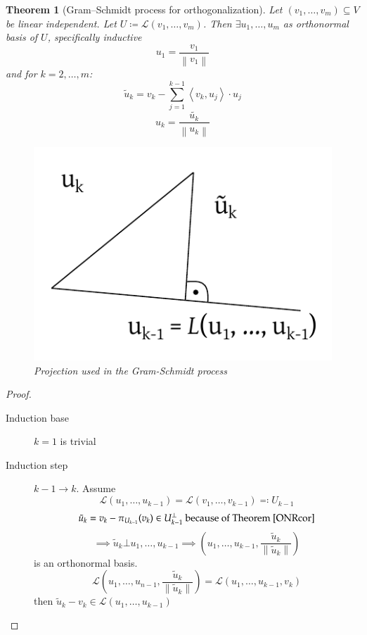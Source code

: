 \documentclass{article}
\newcounter{lecref}[section]
\numberwithin{lecref}{section}
\newtheorem{theorem}[lecref]{Theorem}
\newcommand{\ip}[2]{\left\langle#1,#2\right\rangle} %
\newcommand{\norm}[1]{\left\|#1\right\|}
\begin{document}
\begin{theorem}[Gram–Schmidt process for orthogonalization] %
  Let $(v_1, \ldots, v_m) \subseteq V$ be linear independent.
  Let $U \coloneqq \mathcal L(v_1, \ldots, v_m)$.
  Then $\exists u_1, \ldots, u_m$ as orthonormal basis of $U$, specifically inductive
  \[ u_1 = \frac{v_1}{\norm{v_1}} \]
  and for $k = 2, \ldots, m$:
  \[ \tilde u_k = v_k - \sum_{j=1}^{k-1} \ip{v_k}{u_j} \cdot u_j \]
  \[ u_k = \frac{\tilde{u_k}}{\norm{u_k}} \]
  \begin{figure}[t]
    \begin{center}
      \includegraphics{img/12_GS_projection.pdf}
      \caption{Projection used in the Gram-Schmidt process}
      \label{GSproj}
    \end{center}
  \end{figure}
\end{theorem}

\begin{proof}
  \begin{description}
    \item[Induction base] $k=1$ is trivial
    \item[Induction step] $k-1 \to k$. Assume
      \[ \mathcal L(u_1, \ldots, u_{k-1}) = \mathcal L(v_1, \ldots, v_{k-1}) \eqqcolon U_{k-1} \]
      \[ \tilde u_k = v_k - \pi_{U_{k-1}}(v_k) \in U_{k-1}^\bot \text{ because of Theorem~\ref{ONRcor}} \]
      \[ \implies \tilde u_k \bot u_1, \ldots, u_{k-1} \implies (u_1, \ldots, u_{k-1}, \frac{\tilde u_k}{\norm{\tilde u_k}}) \]
      is an orthonormal basis.
      \[
        \mathcal L(u_1, \ldots, u_{n-1}, \frac{\tilde u_k}{\norm{\tilde u_k}})
          = \mathcal L(u_1, \ldots, u_{k-1}, v_k)
      \]
      then $\tilde u_k - v_k \in \mathcal L(u_1, \ldots, u_{k-1})$
  \end{description}
\end{proof}
\end{document}
